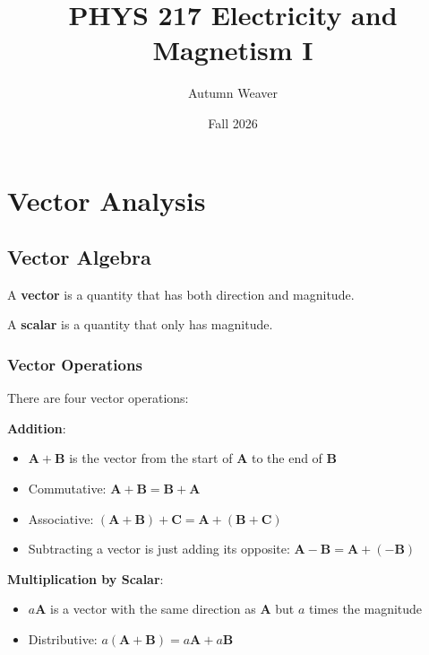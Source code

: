 \documentclass{article}
\title{\textbf{PHYS 217 Electricity and Magnetism I}}
\author{Autumn Weaver}
\date{Fall 2026}
\begin{document}
\maketitle

\tableofcontents{\textbf{}}

\pagebreak

\pagestyle{fancy}
\fancyhead{}
\fancyhead[L]{\thetitle}

\section{Vector Analysis}
\subsection{Vector Algebra}
\begin{definition}
    A \textbf{vector} is a quantity that has both direction and magnitude.
\end{definition}

\begin{definition}
    A \textbf{scalar} is a quantity that only has magnitude.
\end{definition}

\subsubsection{Vector Operations}

There are four vector operations:

\textbf{Addition}:
\begin{itemize}
    \item \(\mathbf{A} +\mathbf{B} \) is the vector from the start of \(\mathbf{A} \) to the end of \(\mathbf{B} \)   
    \item Commutative: \(\mathbf{A} +\mathbf{B} =\mathbf{B} +\mathbf{A} \) 
    \item Associative: \((\mathbf{A} +\mathbf{B} )+\mathbf{C} =\mathbf{A} +(\mathbf{B} +\mathbf{C} )\)
    \item Subtracting a vector is just adding its opposite: \(\mathbf{A} -\mathbf{B} =\mathbf{A} +(-\mathbf{B}) \) 
\end{itemize}


\textbf{Multiplication by Scalar}:
\begin{itemize}
    \item \(a \mathbf{A} \) is a vector with the same direction as \(\mathbf{A} \) but \(a\) times the magnitude
    \item Distributive: \(a(\mathbf{A} +\mathbf{B} )=a \mathbf{A} +a \mathbf{B} \)    
\end{itemize}
\end{document}
